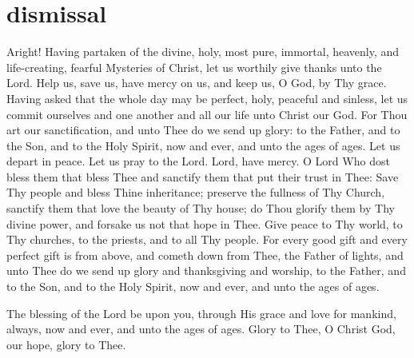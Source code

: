 \section{dismissal}

\begin{liturgicaltext}
    \deacon Aright! Having partaken of the divine, holy, most pure, immortal, heavenly, and life-creating, fearful Mysteries of Christ, let us worthily give thanks unto the Lord. 
    \choir {}
    \deacon Help us, save us, have mercy on us, and keep us, O God, by Thy grace. 
    \choir {}
    \deacon Having asked that the whole day may be perfect, holy, peaceful and sinless, let us commit ourselves and one another and all our life unto Christ our God. 
    \choir {}
    \priest For Thou art our sanctification, and unto Thee do we send up glory: to the Father, and to the Son, and to the Holy Spirit, now and ever, and unto the ages of ages.
    \choir {}
    \priest Let us depart in peace. 
    \choir {}
    \deacon Let us pray to the Lord.
    \choir Lord, have mercy.
    \priest O Lord Who dost bless them that bless Thee and sanctify them that put their trust in Thee: Save Thy people and bless Thine inheritance; preserve the fullness of Thy Church, sanctify them that love the beauty of Thy house; do Thou glorify them by Thy divine power, and forsake us not that hope in Thee. Give peace to Thy world, to Thy churches, to the priests, and to all Thy people. For every good gift and every perfect gift is from above, and cometh down from Thee, the Father of lights, and unto Thee do we send up glory and thanksgiving and worship, to the Father, and to the Son, and to the Holy Spirit, now and ever, and unto the ages of ages. \pagebreak
    \choir
\end{liturgicaltext}
\begin{liturgicaltext}
    \priest The blessing of the Lord be upon you, through His grace and love for mankind, always, now and ever, and unto the ages of ages.
    \choir {}
    \priest Glory to Thee, O Christ God, our hope, glory to Thee. \pagebreak
    \choir
\end{liturgicaltext}
